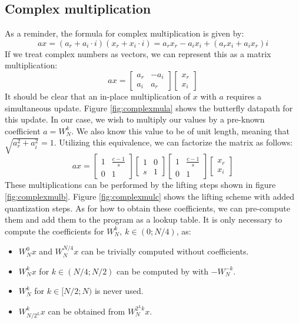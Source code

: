 \subsection{Complex multiplication}
As a reminder, the formula for complex multiplication is given by:
\begin{equation}
    ax = (a_r + a_i \cdot i)(x_r + x_i \cdot i) = a_rx_r - a_ix_i + (a_r x_i + a_ix_r)i
\end{equation}
If we treat complex numbers as vectors, we can represent this as a matrix multiplication:
\begin{equation}
    ax =
    \begin{bmatrix}
        a_r &-a_i\\
        a_i &a_r
    \end{bmatrix}
    \begin{bmatrix}
        x_r\\
        x_i
    \end{bmatrix}
\end{equation}
It should be clear that an in-place multiplication of $x$ with $a$ requires a simultaneous update.
Figure \ref{fig:complexmula} shows the butterfly datapath for this update.
In our case, we wish to multiply our values by a pre-known coefficient $a = W_N^k$.
We also know this value to be of unit length, meaning that $\sqrt{a_r^2 + a_i^2} = 1$.
Utilizing this equivalence, we can factorize the matrix as follows:
\begin{equation}
    ax =
    \begin{bmatrix}
        1 &\frac{c-1}{s}\\
        0 &1
    \end{bmatrix}
    \begin{bmatrix}
        1 &0\\
        s &1
    \end{bmatrix}
    \begin{bmatrix}
        1 &\frac{c - 1}{s}\\
        0 &1
    \end{bmatrix}
    \begin{bmatrix}
        x_r\\
        x_i
    \end{bmatrix}
\end{equation}
These multiplications can be performed by the lifting steps shown in figure \ref{fig:complexmulb}.
Figure \ref{fig:complexmulc} shows the lifting scheme with added quantization steps.
As for how to obtain these coefficients,
we can pre-compute them and add them to the program as a lookup table.
It is only necessary to compute the coefficients for $W_N^k,~k \in (0;N/4)$, as:
\begin{itemize}
    \item $W_N^0 x$ and $W_N^{N/4} x$ can be trivially computed without coefficients.
    \item $W_N^k x$ for $k \in (N/4; N/2)$ can be computed by with $-W_N^{-k}$.
    \item $W_N^k$ for $k \in [N/2;N)$ is never used.
    \item $W_{N/2^L}^k x$ can be obtained from $W_N^{2^L k} x$.
\end{itemize}

